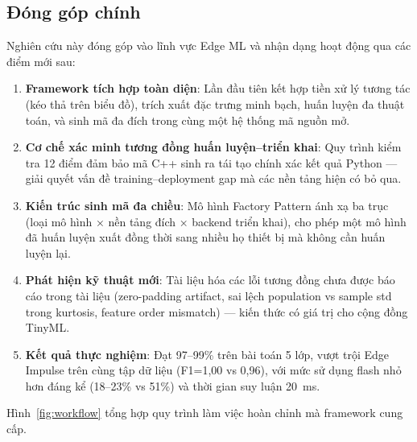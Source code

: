 \subsection{Đóng góp chính}

Nghiên cứu này đóng góp vào lĩnh vực Edge ML và nhận dạng hoạt động qua các điểm mới sau:

\begin{enumerate}
    \item \textbf{Framework tích hợp toàn diện}: Lần đầu tiên kết hợp tiền xử lý tương tác (kéo thả trên biểu đồ), trích xuất đặc trưng minh bạch, huấn luyện đa thuật toán, và sinh mã đa đích trong cùng một hệ thống mã nguồn mở.
    
    \item \textbf{Cơ chế xác minh tương đồng huấn luyện--triển khai}: Quy trình kiểm tra 12 điểm đảm bảo mã C++ sinh ra tái tạo chính xác kết quả Python --- giải quyết vấn đề training--deployment gap mà các nền tảng hiện có bỏ qua.
    
    \item \textbf{Kiến trúc sinh mã đa chiều}: Mô hình Factory Pattern ánh xạ ba trục (loại mô hình × nền tảng đích × backend triển khai), cho phép một mô hình đã huấn luyện xuất đồng thời sang nhiều họ thiết bị mà không cần huấn luyện lại.
    
    \item \textbf{Phát hiện kỹ thuật mới}: Tài liệu hóa các lỗi tương đồng chưa được báo cáo trong tài liệu (zero-padding artifact, sai lệch population vs sample std trong kurtosis, feature order mismatch) --- kiến thức có giá trị cho cộng đồng TinyML.
    
    \item \textbf{Kết quả thực nghiệm}: Đạt 97--99\% trên bài toán 5 lớp, vượt trội Edge Impulse trên cùng tập dữ liệu (F1=1,00 vs 0,96), với mức sử dụng flash nhỏ hơn đáng kể (18--23\% vs 51\%) và thời gian suy luận 20~ms.
\end{enumerate}

Hình~\ref{fig:workflow} tổng hợp quy trình làm việc hoàn chỉnh mà framework cung cấp.

